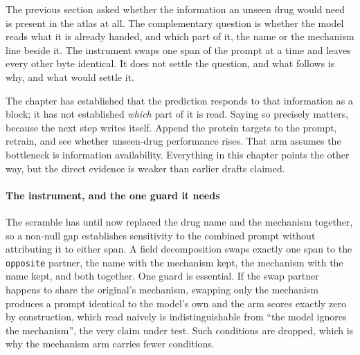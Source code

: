
\begin{question}[9]
The previous section asked whether the information an unseen drug would need is
present in the atlas at all. The complementary question is whether the model
reads what it is already handed, and which part of it, the name or the mechanism
line beside it. The instrument swaps one span of the prompt at a time and leaves
every other byte identical. It does not settle the question, and what follows is
why, and what would settle it.
\end{question}

\noindent
The chapter has established that the prediction responds to that information as a
block; it has not established \emph{which} part of it is read. Saying so
precisely matters, because the next step writes itself. Append the protein
targets to the prompt, retrain, and see whether unseen-drug performance rises.
That arm assumes the bottleneck is information availability. Everything in this
chapter points the other way, but the direct evidence is weaker than earlier
drafts claimed.

\paragraph{The instrument, and the one guard it needs} The scramble has until now
replaced the drug name and the mechanism together, so a non-null gap establishes
sensitivity to the combined prompt without attributing it to either span. A field
decomposition swaps exactly one span to the \texttt{opposite} partner, the name
with the mechanism kept, the mechanism with the name kept, and both together. One
guard is essential. If the swap partner happens to share the original's
mechanism, swapping only the mechanism produces a prompt identical to the model's
own and the arm scores exactly zero by construction, which read naively is
indistinguishable from ``the model ignores the mechanism'', the very claim under
test. Such conditions are dropped, which is why the mechanism arm carries fewer
conditions.

